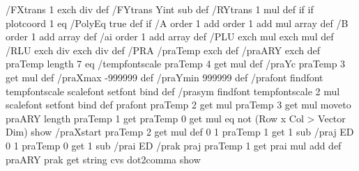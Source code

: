 {{       /FXtrans { 1 exch div } def /FYtrans {Yint sub} def /RYtrans {1 mul} def } if
  \psk@CustomFit{} if %
  plotcoord 1 eq { /PolyEq true def } if
  /A order 1 add order 1 add mul array def
  /B order 1 add array def
  /ai order 1 add array def
  /PLU {exch \pst@number\psxunit\space mul exch \pst@number\psyunit\space mul } def
  /RLU {exch \pst@number\psxunit\space div exch \pst@number\psyunit\space div } def
  /PRA { %
         /praTemp exch def /praARY exch def
         praTemp length 7 eq {%
         /tempfontscale \psk@fontscale praTemp 4 get mul def
         /praYc praTemp 3 get \pst@number\psyunit\space mul def
         /praXmax -999999 def
         /praYmin 999999 def
         /prafont {\psk@PSfont\space findfont tempfontscale scalefont setfont} bind def
         /prasym { \psk@symbolFont\space findfont tempfontscale 2 mul scalefont setfont} bind def
         prafont
         praTemp 2 get \pst@number\psxunit\space mul praTemp 3 get \pst@number\psyunit\space mul moveto
         praARY length praTemp 1 get praTemp 0 get mul eq not { (Row x Col > Vector Dim) show }{%
         /praXstart praTemp 2 get \pst@number\psxunit\space mul def
         0 1 praTemp 1 get 1 sub {/praj ED
         0 1 praTemp 0 get 1 sub {/prai ED /prak praj praTemp 1 get prai mul add def
         praARY prak get \psk@valuewidth string cvs \ifPst@comma\space dot2comma \fi show
}}}}}}
